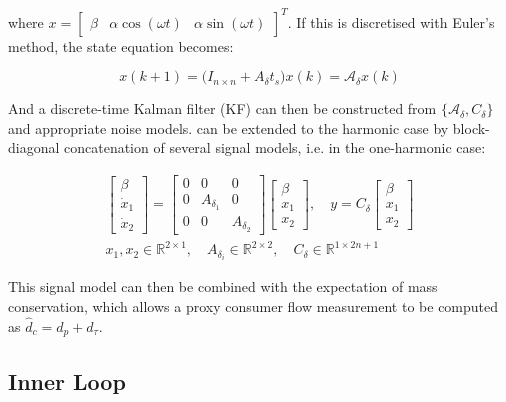 where $x = \begin{bmatrix}\beta & \alpha \cos(\omega t) & \alpha \sin(\omega t)\end{bmatrix}^T$. If this is discretised with Euler's method, the state equation becomes:

\begin{equation}\label{eq:TheisticDisturbanceEstimatorDiscrete}
	x(k+1) = \Big(I_{n\times n} + A_\delta t_s \Big) x(k) = \mathcal{A}_\delta x(k)
\end{equation}

And a discrete-time Kalman filter (KF) can then be constructed from $\{\mathcal{A}_\delta,C_\delta\}$ and appropriate noise models.  can be extended to the harmonic case by block-diagonal concatenation of several signal models, i.e. in the one-harmonic case:

\begin{equation}\label{eq:DisturbanceVectorCase}
	\begin{gathered}
		\begin{bmatrix} \beta \\ \dot{x}_1 \\ \dot{x}_2 \end{bmatrix} = \begin{bmatrix} 0 & 0 & 0 \\ 0 & A_{\delta_1} & 0 \\ 0 & 0 & A_{\delta_2} \end{bmatrix} \begin{bmatrix}\beta \\ x_1 \\ x_2 \end{bmatrix},
		 \quad y = C_\delta \begin{bmatrix}\beta \\ x_1 \\ x_2 \end{bmatrix} \\
		 x_1, x_2 \in \mathbb{R}^{2\times1}, \quad {A}_{\delta_i} \in \mathbb{R}^{2\times2}, \quad
		 C_\delta \in \mathbb{R}^{1\times2n+1}
	\end{gathered}
\end{equation}

This signal model can then be combined with the expectation of mass conservation, which allows a proxy consumer flow measurement to be computed as $\hat{d}_c = d_p + d_\tau$.


\subsection{Inner Loop}\label{subsec:InnerLoop}


